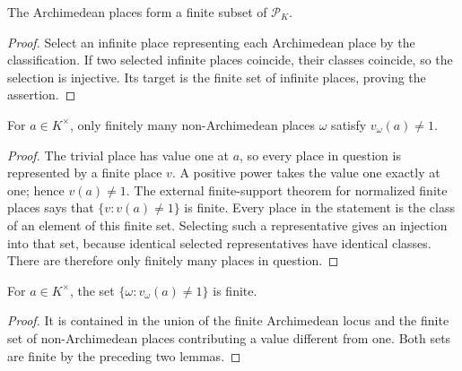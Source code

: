 \begin{lemma}\label{lem:number-field-archimedean-finite}
\leanok
{}
The Archimedean places form a finite subset of $\mathcal P_K$.
\end{lemma}
\begin{proof}
Select an infinite place representing each Archimedean place by the
classification. If two selected infinite places coincide, their classes
coincide, so the selection is injective. Its target is the finite set of
infinite places, proving the assertion.
\end{proof}

\begin{lemma}\label{lem:number-field-finite-contributions}
\leanok
{}
For $a\in K^\times$, only finitely many non-Archimedean places $\omega$
satisfy $v_\omega(a)\ne1$.
\end{lemma}
\begin{proof}
The trivial place has value one at $a$, so every place in question is
represented by a finite place $v$. A positive power takes the value one
exactly at one; hence $v(a)\ne1$. The external finite-support theorem
for normalized finite places says that $\{v:v(a)\ne1\}$ is finite.
Every place in the statement is the class of an element of this finite
set. Selecting such a representative gives an injection into that set,
because identical selected representatives have identical classes.
There are therefore only finitely many places in question.
\end{proof}

\begin{lemma}\label{lem:number-field-finite-support}
\leanok
{}
For $a\in K^\times$, the set $\{\omega:v_\omega(a)\ne1\}$ is finite.
\end{lemma}
\begin{proof}
It is contained in the union of the finite Archimedean locus and the
finite set of non-Archimedean places contributing a value different from
one. Both sets are finite by the preceding two lemmas.
\end{proof}

